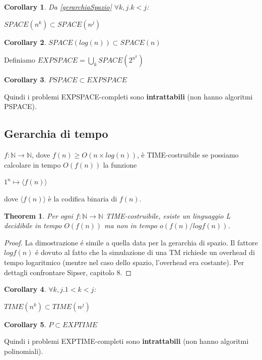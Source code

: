 \documentclass[a4paper, 12pt]{article}
\newtheorem{theorem}{Theorem}[section]
\newtheorem{corollary}{Corollary}[theorem]
\begin{document}
\begin{corollary}
Da \ref{gerarchiaSpazio} $\forall k,j. k < j$:
\begin{center}
$SPACE(n^{k}) \subset SPACE(n^{j})$
\end{center}
\end{corollary}
\begin{corollary}
$SPACE(log(n)) \subset SPACE(n)$
\end{corollary}
Definiamo $EXPSPACE =  \bigcup_{k}SPACE(2^{n^{k}})$
\begin{corollary}
$PSPACE \subset EXPSPACE$
\end{corollary}
Quindi i problemi EXPSPACE-completi sono \textbf{intrattabili} (non hanno algoritmi PSPACE).

\subsection{Gerarchia di tempo}
$f: \mathbb{N} \rightarrow \mathbb{N}$, dove $f(n) \geq O(n \times log(n))$, \`e TIME-costruibile se possiamo calcolare in tempo $O(f(n))$ la funzione
\begin{center}
$1^{n} \longmapsto \langle f(n) \rangle$
\end{center}
dove $\langle f(n) \rangle$ \`e la codifica binaria di $f(n)$.
\begin{theorem}
Per ogni $f:\mathbb{N} \rightarrow \mathbb{N}$ TIME-costruibile, esiste un linguaggio L decidibile in tempo $O(f(n))$ ma non in tempo $o(f(n) / log f(n))$.
\end{theorem}
\begin{proof}
La dimostrazione é simile a quella data per la gerarchia di spazio. Il fattore $log f(n)$ é dovuto al fatto che la simulazione di una TM richiede un overhead di tempo logaritmico (mentre nel caso dello spazio, l’overhead era costante). Per dettagli confrontare Sipser, capitolo 8.
\end{proof}

\begin{corollary}
$\forall k,j. 1<k<j$: \begin{center}
$TIME(n^{k}) \subset TIME(n^{j})$
\end{center}
\end{corollary}
\begin{corollary}
$P \subset EXPTIME$
\end{corollary}
Quindi i problemi EXPTIME-completi sono \textbf{intrattabili} (non hanno algoritmi polinomiali).
\end{document}
